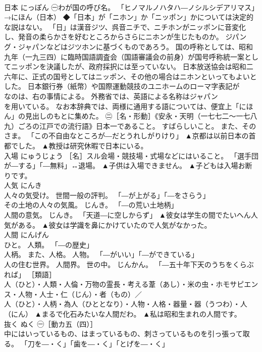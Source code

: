 \documentclass[8pt]{extreport}
\begin{document}
\begin{CJK}{UTF8}{min}
\\	日本	にっぽん	㊀わが国の呼び名。 「ヒノマルノハタハ―ノシルシデアリマス」→にほん（日本） ◆「日本」が「ニホン」か「ニッポン」かについては決定的な説はない。 「日」は漢音ジツ、呉音ニチで、ニチホンがニッポンに音変化し、発音の柔らかさを好むところからさらにニホンが生じたものか。 ジパング・ジャパンなどはジツホンに基づくものであろう。 国の呼称としては、昭和九年（一九三四）に臨時国語調査会（国語審議会の前身）が国号呼称統一案としてニッポンを決議したが、政府採択には至っていない。 日本放送協会は昭和二六年に、正式の国号としてはニッポン、その他の場合はニホンといってもよいとした。 日本銀行券（紙幣）や国際運動競技のユニホームのローマ字表記が
\\	なのは、右の事情による。 外務省では、英語による名称はジャパン
\\	を用いている。 なお本辞典では、両様に通用する語については、便宜上「にほん」の見出しのもとに集めた。 ㊁［名・形動］《安永・天明（一七七二〜一七八九）ごろの江戸での流行語》日本一であること。 すばらしいこと。 また、そのさま。 「この不自由なところが―だとうれしがりけり」	▲京都は以前日本の首都でした。 ▲教授は研究休暇で日本にいる。
\\	入場	にゅうじょう	［名］スル会場・競技場・式場などにはいること。 「選手団が―する」「―無料」↔退場。	▲子供は入場できません。 ▲子どもは入場お断りです。
\\	人気	にんき	
\\	人々の気受け。 世間一般の評判。 「―が上がる」「―をさらう」 
\\	その土地の人々の気風。 じんき。 「―の荒い土地柄」 
\\	人間の意気。 じんき。 「天道―に空しからず」	▲彼女は学生の間でたいへん人気がある。 ▲彼女は学識を鼻にかけていたので人気がなかった。
\\	人間	にんげん	
\\	ひと。 人類。 「―の歴史」 
\\	人柄。 また、人格。 人物。 「―がいい」「―ができている」 
\\	人の住む世界。 人間界。 世の中。 じんかん。 「―五十年下天のうちをくらぶれば」 ［類語］
\\	人（ひと）・人類・人倫・万物の霊長・考える葦（あし）・米の虫・ホモサピエンス・人物・人士・仁（じん）・者（もの）／
\\	人（ひと）・人柄・為人（ひととなり）・人物・人格・器量・器（うつわ）・人（にん）	▲まるで化石みたいな人間だわ。 ▲私は昭和生まれの人間です。
\\	抜く	ぬく	㊀［動カ五（四）］ 
\\	中にはいっているもの、はまっているもの、刺さっているものを引っ張って取る。 「刀を―・く」「歯を―・く」「とげを―・く」 

\end{CJK}
\end{document}
